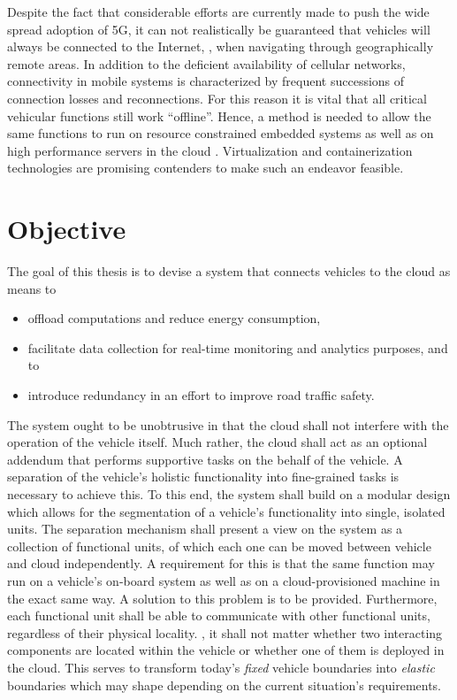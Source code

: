 Despite the fact that considerable efforts are currently made to push the wide spread adoption of 5G, it can not realistically be guaranteed that vehicles will always be connected to the Internet, \eg , when navigating through geographically remote areas. In addition to the deficient availability of cellular networks, connectivity in mobile systems is characterized by frequent successions of connection losses and reconnections. For this reason it is vital that all critical vehicular functions still work ``offline''. Hence, a method is needed to allow the same functions to run on resource constrained embedded systems as well as on high performance servers in the cloud \cite{white2010r}. Virtualization and containerization technologies are promising contenders to make such an endeavor feasible.

%
%
%
%
%
%
%
%
%
%

\section{Objective}
The goal of this thesis is to devise a system that connects vehicles to the cloud as means to 
\begin{itemize}
\item offload computations and reduce energy consumption,
\item facilitate data collection for real-time monitoring and analytics purposes, and to
\item introduce redundancy in an effort to improve road traffic safety.
\end{itemize} 
The system ought to be unobtrusive in that the cloud shall not interfere with the operation of the vehicle itself. Much rather, the cloud shall act as an optional addendum that performs supportive tasks on the behalf of the vehicle. A separation of the vehicle's holistic functionality into fine-grained tasks is necessary to achieve this. To this end, the system shall build on a modular design which allows for the segmentation of a vehicle's functionality into single, isolated units. The separation mechanism shall present a view on the system as a collection of functional units, of which each one can be moved between vehicle and cloud independently. A requirement for this is that the same function may run on a vehicle's on-board system as well as on a cloud-provisioned machine in the exact same way. A solution to this problem is to be provided. Furthermore, each functional unit shall be able to communicate with other functional units, regardless of their physical locality. \Ie , it shall not matter whether two interacting components are located within the vehicle or whether one of them is deployed in the cloud. This serves to transform today's \emph{fixed} vehicle boundaries into \emph{elastic} boundaries which may shape depending on the current situation's requirements.

